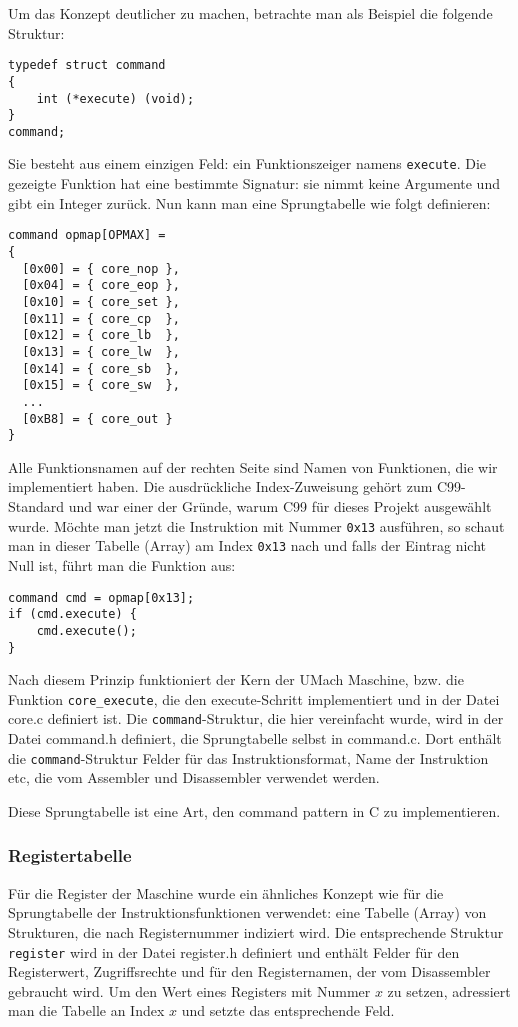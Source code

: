 Um das Konzept deutlicher zu machen, betrachte man als Beispiel die folgende
Struktur:
\begin{lstlisting}
typedef struct command 
{
    int (*execute) (void);
}
command;
\end{lstlisting}

Sie besteht aus einem einzigen Feld: ein Funktionszeiger namens
\texttt{execute}. Die gezeigte Funktion hat eine bestimmte Signatur: sie nimmt
keine Argumente und gibt ein Integer zurück. Nun kann man eine Sprungtabelle wie
folgt definieren:
\begin{lstlisting}
command opmap[OPMAX] = 
{
  [0x00] = { core_nop },
  [0x04] = { core_eop },
  [0x10] = { core_set },
  [0x11] = { core_cp  },
  [0x12] = { core_lb  },
  [0x13] = { core_lw  },
  [0x14] = { core_sb  },
  [0x15] = { core_sw  },
  ...
  [0xB8] = { core_out }
}
\end{lstlisting}

Alle Funktionsnamen auf der rechten Seite sind Namen von Funktionen, die wir
implementiert haben. Die ausdrückliche Index-Zuweisung gehört zum C99-Standard
und war einer der Gründe, warum C99 für dieses Projekt ausgewählt wurde. Möchte
man jetzt die Instruktion mit Nummer \texttt{0x13} ausführen, so schaut man in
dieser Tabelle (Array) am Index \texttt{0x13} nach und falls der Eintrag nicht
Null ist, führt man die Funktion aus:

\begin{lstlisting}
command cmd = opmap[0x13];
if (cmd.execute) {
    cmd.execute();
}
\end{lstlisting}

Nach diesem Prinzip funktioniert der Kern der UMach Maschine, bzw. die Funktion
\texttt{core\_execute}, die den \glqq{}execute\grqq{}-Schritt implementiert und
in der Datei core.c definiert ist. Die \texttt{command}-Struktur, die hier
vereinfacht wurde, wird in der Datei command.h definiert, die Sprungtabelle
selbst in command.c. Dort enthält die \texttt{command}-Struktur Felder für das
Instruktionsformat, Name der Instruktion etc, die vom Assembler und Disassembler
verwendet werden.

Diese Sprungtabelle ist eine Art, den \glqq{}command pattern\grqq{} in C zu
implementieren.


\subsubsection{Registertabelle}

Für die Register der Maschine wurde ein ähnliches Konzept wie für die
Sprungtabelle der Instruktionsfunktionen verwendet: eine Tabelle (Array) von
Strukturen, die nach Registernummer indiziert wird. Die entsprechende Struktur
\texttt{register} wird in der Datei register.h definiert und enthält Felder für
den Registerwert, Zugriffsrechte und für den Registernamen, der vom Disassembler
gebraucht wird. Um den Wert eines Registers mit Nummer $x$ zu setzen,
adressiert man die Tabelle an Index $x$ und setzte das entsprechende Feld.










